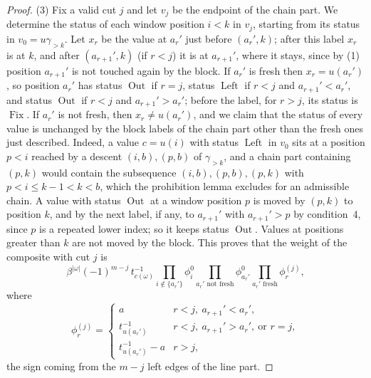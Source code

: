\documentclass[11pt]{article}
\newcommand{\Fix}{\operatorname{Fix}}
\newcommand{\Left}{\operatorname{Left}}
\newcommand{\Out}{\operatorname{Out}}
\begin{document}
\begin{proof}
(3) Fix a valid cut $j$ and let $v_j$ be the endpoint of the chain
part. We determine the status of each window position $i<k$ in $v_j$,
starting from its status in $v_0=u\gamma_{>k}$. Let $x_r$ be the value
at $a_r'$ just before $(a_r',k)$; after this label $x_r$ is at $k$, and
after $(a_{r+1}',k)$ (if $r<j$) it is at $a_{r+1}'$, where it stays,
since by (1) position $a_{r+1}'$ is not touched again by the block.
If $a_r'$ is fresh then $x_r=u(a_r')$, so position $a_r'$ has status
$\Out$ if $r=j$, status $\Left$ if $r<j$ and $a_{r+1}'<a_r'$, and status
$\Out$ if $r<j$ and $a_{r+1}'>a_r'$; before the label, for $r>j$, its
status is $\Fix$. If $a_r'$ is not fresh, then $x_r\neq u(a_r')$, and
we claim that the status of every value is unchanged by the block
labels of the chain part other than the fresh ones just described.
Indeed, a value $c=u(i)$ with status $\Left$ in $v_0$ sits at a position
$p<i$ reached by a descent $(i,b),(p,b)$ of $\gamma_{>k}$, and a chain
part containing $(p,k)$ would contain the subsequence
$(i,b),(p,b),(p,k)$ with $p<i\leq k-1<k<b$, which the prohibition
lemma \cite[Lemma~2.9]{lenart2007pieri} excludes for an admissible
chain. A value with status $\Out$ at a window position $p$ is moved
by $(p,k)$ to position $k$, and by the next label, if any, to
$a_{r+1}'$ with $a_{r+1}'>p$ by condition~4, since $p$ is a repeated
lower index; so it keeps status $\Out$. Values at positions
greater than $k$ are not moved by the block. This proves that the
weight of the composite with cut $j$ is
\[
 \beta^{|\omega|}(-1)^{m-j}\,t_{c(\omega)}^{-1}
 \prod_{i\notin\{a_r'\}}\phi_i^0
 \prod_{a_r'\text{ not fresh}}\phi^0_{a_r'}
 \prod_{a_r'\text{ fresh}}\phi_r^{(j)},
\]
where
\[
 \phi_r^{(j)}=\begin{cases}
  a& r<j,\ a_{r+1}'<a_r',\\
  t_{u(a_r')}^{-1}& r<j,\ a_{r+1}'>a_r',\ \text{or } r=j,\\
  t_{u(a_r')}^{-1}-a& r>j,
 \end{cases}
\]
the sign coming from the $m-j$ left edges of the line part.


\end{proof}
\end{document}

